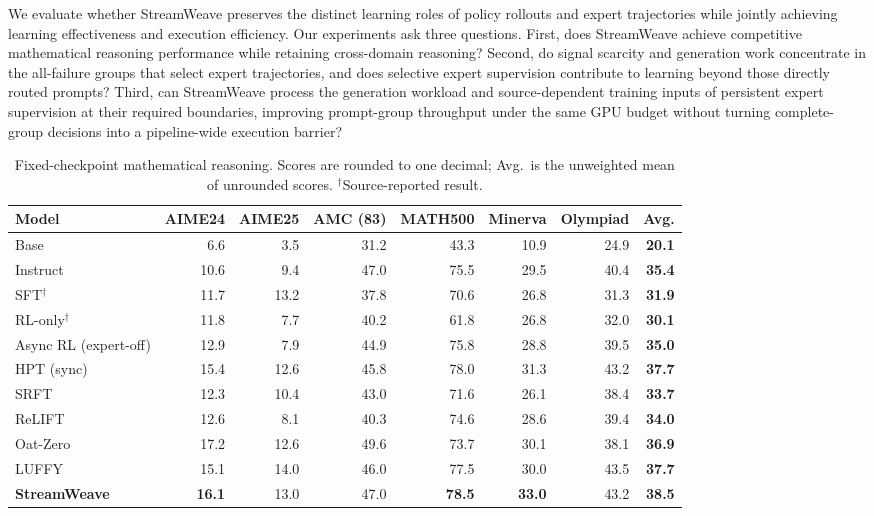 \documentclass[letterpaper]{article}
\begin{document}
We evaluate whether StreamWeave preserves the distinct learning roles of policy rollouts and expert trajectories while jointly achieving learning effectiveness and execution efficiency.
Our experiments ask three questions.
First, does StreamWeave achieve competitive mathematical reasoning performance while retaining cross-domain reasoning?
Second, do signal scarcity and generation work concentrate in the all-failure groups that select expert trajectories, and does selective expert supervision contribute to learning beyond those directly routed prompts?
Third, can StreamWeave process the generation workload and source-dependent training inputs of persistent expert supervision at their required boundaries, improving prompt-group throughput under the same GPU budget without turning complete-group decisions into a pipeline-wide execution barrier?

\begin{table}[t]
\centering
\begin{tabular}{lrrrrrrr}
\toprule
Model & AIME24 & AIME25 & AMC (83) & MATH500 & Minerva & Olympiad & \textbf{Avg.} \\
\midrule
Base & 6.6 & 3.5 & 31.2 & 43.3 & 10.9 & 24.9 & \textbf{20.1} \\
Instruct & 10.6 & 9.4 & 47.0 & 75.5 & 29.5 & 40.4 & \textbf{35.4} \\
SFT$^{\dagger}$ & 11.7 & 13.2 & 37.8 & 70.6 & 26.8 & 31.3 & \textbf{31.9} \\
RL-only$^{\dagger}$ & 11.8 & 7.7 & 40.2 & 61.8 & 26.8 & 32.0 & \textbf{30.1} \\
Async RL (expert-off) & 12.9 & 7.9 & 44.9 & 75.8 & 28.8 & 39.5 & \textbf{35.0} \\
HPT (sync) & 15.4 & 12.6 & 45.8 & 78.0 & 31.3 & 43.2 & \textbf{37.7} \\
SRFT & 12.3 & 10.4 & 43.0 & 71.6 & 26.1 & 38.4 & \textbf{33.7} \\
ReLIFT & 12.6 & 8.1 & 40.3 & 74.6 & 28.6 & 39.4 & \textbf{34.0} \\
Oat-Zero & 17.2 & 12.6 & 49.6 & 73.7 & 30.1 & 38.1 & \textbf{36.9} \\
LUFFY & 15.1 & 14.0 & 46.0 & 77.5 & 30.0 & 43.5 & \textbf{37.7} \\
\textbf{StreamWeave} & \textbf{16.1} & 13.0 & 47.0 & \textbf{78.5} & \textbf{33.0} & 43.2 & \textbf{38.5} \\
\bottomrule
\end{tabular}
\caption{Fixed-checkpoint mathematical reasoning.
Scores are rounded to one decimal; Avg.\ is the unweighted mean of unrounded scores.
$^{\dagger}$Source-reported result.}
\label{tab:math-reasoning}
\end{table}
\end{document}
